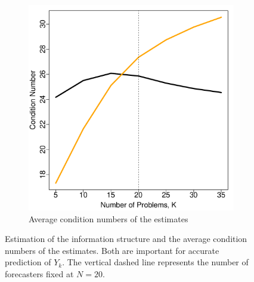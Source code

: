 \documentclass[11pt]{article}
\theoremstyle{definition}
\theoremstyle{definition}
\begin{document}
\begin{figure}[t!]
\begin{subfigure}{0.5\textwidth}
                \includegraphics[width=\textwidth]{simResCond.pdf}
                \caption{Average condition numbers of the estimates}
                                \label{SigmaInv}
        \end{subfigure}
        \caption{Estimation of the information structure and the average  condition numbers of the estimates. Both are important for accurate prediction of $Y_k$. The vertical dashed line represents the number of forecasters fixed at $N = 20$.}
        \label{SigmaEstimation}
\end{figure}
\end{document}
